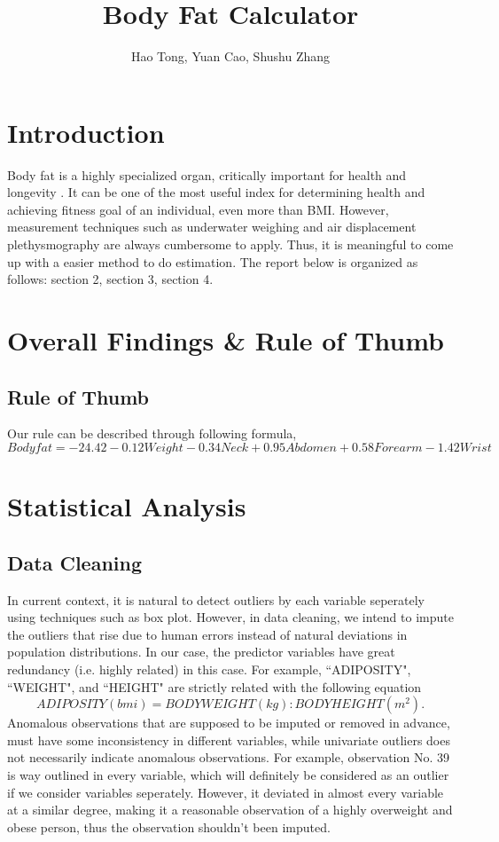 \documentclass[12pt, letterpaper]{article}
\title{Body Fat Calculator}
\author{Hao Tong, Yuan Cao, Shushu Zhang}
\begin{document}
\maketitle

\section{Introduction}

Body fat is a highly specialized organ, critically important for health and longevity \cite{ludwig2016always}. It can be one of the most useful index for determining health and achieving fitness goal of an individual, even more than BMI. However, measurement techniques such as underwater weighing and air displacement plethysmography are always cumbersome to apply. Thus, it is meaningful to come up with a easier method to do estimation. The report below is organized as follows: section 2, section 3, section 4.

\section{Overall Findings \& Rule of Thumb}
\subsection{Rule of Thumb}
Our rule can be described through following formula,
$$Bodyfat=-24.42-0.12Weight-0.34Neck+0.95Abdomen+0.58Forearm-1.42Wrist$$

\section{Statistical Analysis}
\subsection{Data Cleaning}
In current context, it is natural to detect outliers by each variable seperately using techniques such as box plot. However, in data cleaning, we intend to impute the outliers that rise due to human errors instead of natural deviations in population distributions. In our case, the predictor variables have great redundancy (i.e. highly related) in this case. For example, ``ADIPOSITY", ``WEIGHT", and ``HEIGHT" are strictly related with the following equation 
$$ADIPOSITY(bmi) = BODY WEIGHT(kg) : BODY HEIGHT(m^2).$$
Anomalous observations that are supposed to be imputed or removed in advance, must have some inconsistency in different variables, while univariate outliers does not necessarily indicate anomalous observations. For example, observation No. 39 is way outlined in every variable, which will definitely be considered as an outlier if we consider variables seperately. However, it deviated in almost every variable at a similar degree, making it a reasonable observation of a highly overweight and obese person, thus the observation shouldn't been imputed. 
\end{document}
